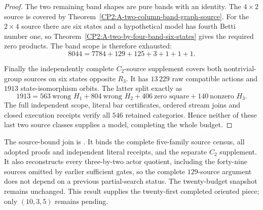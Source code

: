 \begin{proof}
The two remaining band shapes are pure bands with an identity.
The $4\times2$ source is covered by
Theorem~\ref{CP2:A-two-column-band-graph-source}.
For the $2\times4$ source there are six states and a hypothetical
model has fourth Betti number one, so
Theorem~\ref{CP2:A-two-by-four-band-six-states} gives the
required zero products.  The band scope is therefore exhausted:
\[
 8044=7784+129+125+3+1+1+1.
\]

Finally the independently complete $C_2$-source supplement
covers both nontrivial-group sources on six states opposite
$R_3$.  It has $13\,229$ raw compatible actions and $1913$
state-isomorphism orbits.  The latter split exactly as
\[
1913=563\ \text{wrong }H_1
     +804\ \text{wrong }H_2
     +406\ \text{zero square}
     +140\ \text{nonzero }H_3.
\]
The full independent scope, literal bar certificates, ordered
stream joins and closed execution receipts verify all $546$
retained categories.  Hence neither of these last two source
classes supplies a model, completing the whole budget.
\end{proof}

\begin{remark*}
The source-bound join is
.
It binds the complete five-family source census, all adopted
proofs and independent literal receipts, and the separate
$C_2$ supplement.  It also reconstructs every three-by-two
actor quotient, including the forty-nine sources omitted by
earlier sufficient gates, so the complete $129$-source argument
does not depend on a previous partial-search status.
The twenty-budget snapshot remains unchanged.  This result
supplies the twenty-first completed oriented piece; only
$(10,3,5)$ remains pending.
\end{remark*}
